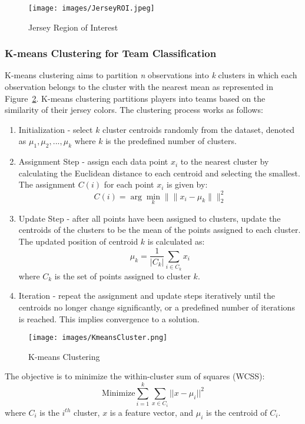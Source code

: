 \documentclass[12pt, letterpaper]{article}
\begin{document}
{\begin{spacing}{1.2}
\begin{figure}[htbp]
\centering
\texttt{[image: images/JerseyROI.jpeg]}
\captionsetup{font=large}
\caption{Jersey Region of Interest}
\label{fig:JerseyROI}
\end{figure}

\subsubsection{K-means Clustering for Team Classification}

K-means clustering aims to partition \textit{n} observations into \textit{k} clusters in which each observation belongs to the cluster with the nearest mean as represented in Figure~\ref{fig:KmeansCluster}. K-means clustering partitions players into teams based on the similarity of their jersey colors. The clustering process works as follows:

\begin{enumerate}
    \item Initialization - select \(k\) cluster centroids randomly from the dataset, denoted as \(\mu_1, \mu_2, ..., \mu_k\) where \(k\) is the predefined number of clusters.
    \item Assignment Step - assign each data point \(x_i\) to the nearest cluster by calculating the Euclidean distance to each centroid and selecting the smallest. The assignment \(C(i)\) for each point \(x_i\) is given by:
    \[ C(i) = \arg\min_{k} \|\|x_i - \mu_k\|\|_2^2 \]
    \item Update Step - after all points have been assigned to clusters, update the centroids of the clusters to be the mean of the points assigned to each cluster. The updated position of centroid \(k\) is calculated as:
    \[ \mu_k = \frac{1}{|C_k|} \sum_{i \in C_k} x_i \]
    where \(C_k\) is the set of points assigned to cluster \(k\).
    \item Iteration - repeat the assignment and update steps iteratively until the centroids no longer change significantly, or a predefined number of iterations is reached. This implies convergence to a solution.
\end{enumerate}

\begin{figure}[htbp]
\centering
\texttt{[image: images/KmeansCluster.png]}
\captionsetup{font=large}
\caption{K-means Clustering}
\label{fig:KmeansCluster}
\end{figure}


The objective is to minimize the within-cluster sum of squares (WCSS):
\[ \text{Minimize} \sum_{i=1}^{k}\sum_{x \in C_i} ||x - \mu_i||^2 \]
where \(C_i\) is the $i^{th}$ cluster, \(x\) is a feature vector, and \(\mu_i\) is the centroid of \(C_i\). 


\end{spacing}}
\end{document}
